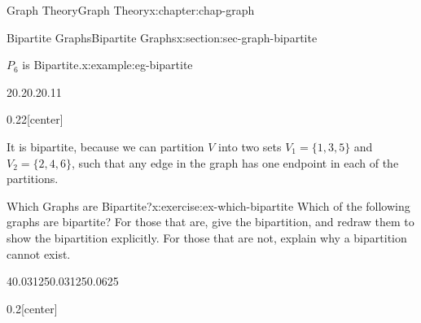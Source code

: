 \documentclass[oneside,10pt,]{book}
\numberwithin{equation}{section}
\begin{document}
\begin{chapterptx}{Graph Theory}{}{Graph Theory}{}{}{x:chapter:chap-graph}
\begin{sectionptx}{Bipartite Graphs}{}{Bipartite Graphs}{}{}{x:section:sec-graph-bipartite}
\begin{example}{\(P_6\) is Bipartite.}{x:example:eg-bipartite}
\begin{sidebyside}{2}{0.2}{0.2}{0.11}
\begin{sbspanel}{0.22}[center]
{
}%
\end{sbspanel}%
\end{sidebyside}%
\par
It is bipartite, because we can partition \(V\) into two sets \(V_1 = \{1,3,5\}\) and \(V_2 = \{2,4,6\}\), such that any edge in the graph has one endpoint in each of the partitions.%
\end{example}
\begin{inlineexercise}{Which Graphs are Bipartite?}{x:exercise:ex-which-bipartite}%
Which of the following graphs are bipartite? For those that are, give the bipartition, and redraw them to show the bipartition explicitly. For those that are not, explain why a bipartition cannot exist.%
\begin{sidebyside}{4}{0.03125}{0.03125}{0.0625}%
\begin{sbspanel}{0.2}[center]%
\end{sbspanel}
\end{sidebyside}
\end{inlineexercise}
\end{sectionptx}
\end{chapterptx}
\end{document}
